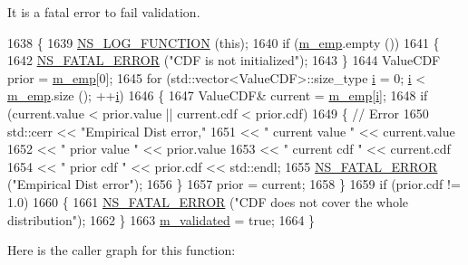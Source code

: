 It is a fatal error to fail validation. 
\begin{DoxyCode}
1638 \{
1639   \hyperlink{log-macros-disabled_8h_a90b90d5bad1f39cb1b64923ea94c0761}{NS\_LOG\_FUNCTION} (\textcolor{keyword}{this});
1640   \textcolor{keywordflow}{if} (\hyperlink{classns3_1_1EmpiricalRandomVariable_aab4864cc028da8bb0c4bd8cfdd723fc7}{m\_emp}.empty ())
1641     \{
1642       \hyperlink{group__fatal_ga5131d5e3f75d7d4cbfd706ac456fdc85}{NS\_FATAL\_ERROR} (\textcolor{stringliteral}{"CDF is not initialized"});
1643     \}
1644   ValueCDF prior = \hyperlink{classns3_1_1EmpiricalRandomVariable_aab4864cc028da8bb0c4bd8cfdd723fc7}{m\_emp}[0];
1645   \textcolor{keywordflow}{for} (std::vector<ValueCDF>::size\_type \hyperlink{bernuolliDistribution_8m_a6f6ccfcf58b31cb6412107d9d5281426}{i} = 0; \hyperlink{bernuolliDistribution_8m_a6f6ccfcf58b31cb6412107d9d5281426}{i} < \hyperlink{classns3_1_1EmpiricalRandomVariable_aab4864cc028da8bb0c4bd8cfdd723fc7}{m\_emp}.size (); ++\hyperlink{bernuolliDistribution_8m_a6f6ccfcf58b31cb6412107d9d5281426}{i})
1646     \{
1647       ValueCDF& current = \hyperlink{classns3_1_1EmpiricalRandomVariable_aab4864cc028da8bb0c4bd8cfdd723fc7}{m\_emp}[\hyperlink{bernuolliDistribution_8m_a6f6ccfcf58b31cb6412107d9d5281426}{i}];
1648       \textcolor{keywordflow}{if} (current.value < prior.value || current.cdf < prior.cdf)
1649         \{ \textcolor{comment}{// Error}
1650           std::cerr << \textcolor{stringliteral}{"Empirical Dist error,"}
1651                << \textcolor{stringliteral}{" current value "} << current.value
1652                << \textcolor{stringliteral}{" prior value "}   << prior.value
1653                << \textcolor{stringliteral}{" current cdf "}   << current.cdf
1654                     << \textcolor{stringliteral}{" prior cdf "}     << prior.cdf << std::endl;
1655           \hyperlink{group__fatal_ga5131d5e3f75d7d4cbfd706ac456fdc85}{NS\_FATAL\_ERROR} (\textcolor{stringliteral}{"Empirical Dist error"});
1656         \}
1657       prior = current;
1658     \}
1659   \textcolor{keywordflow}{if} (prior.cdf != 1.0)
1660     \{
1661       \hyperlink{group__fatal_ga5131d5e3f75d7d4cbfd706ac456fdc85}{NS\_FATAL\_ERROR} (\textcolor{stringliteral}{"CDF does not cover the whole distribution"});
1662     \}
1663   \hyperlink{classns3_1_1EmpiricalRandomVariable_aa3038da76db39faac73ceb5445791205}{m\_validated} = \textcolor{keyword}{true};
1664 \}
\end{DoxyCode}


Here is the caller graph for this function\+:




